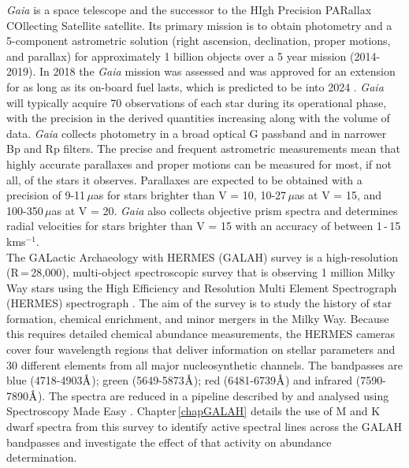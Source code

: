 \textit{Gaia} \citep{2016Gaia} is a space telescope and the successor to the HIgh Precision PARallax COllecting Satellite \citep[HIPPARCOS;][]{1981Kovalevsky} satellite. Its primary mission is to obtain photometry and a 5-component astrometric solution (right ascension, declination, proper motions, and parallax) for approximately 1 billion objects over a 5 year mission (2014-2019). In 2018 the \textit{Gaia} mission was assessed and was approved for an extension for as long as its on-board fuel lasts, which is predicted to be into 2024 \citep{2019Brown}. \textit{Gaia} will typically acquire 70 observations of each star during its operational phase, with the precision in the derived quantities increasing along with the volume of data. \textit{Gaia} collects photometry in a broad optical G passband and in narrower Bp and Rp filters. The precise and frequent astrometric measurements mean that highly accurate parallaxes and proper motions can be measured for most, if not all, of the stars it observes. Parallaxes are expected to be obtained with a precision of 9-11\,$\mu$as for stars brighter than V = 10, 10-27\,$\mu$as at V = 15, and 100-350\,$\mu$as at V = 20. \textit{Gaia} also collects objective prism spectra and determines radial velocities for stars brighter than V = 15 with an accuracy of between 1\,-\,15\,kms$^{-1}$.\\

The GALactic Archaeology with HERMES (GALAH) survey \citep{2021Buder} is a high-resolution (R\,=\,28,000), multi-object spectroscopic survey that is observing 1 million Milky Way stars using the High Efficiency and Resolution Multi Element Spectrograph (HERMES) spectrograph \citep{2015Sheinis}. The aim of the survey is to study the history of star formation, chemical enrichment, and minor mergers in the Milky Way. Because this requires detailed chemical abundance measurements, the HERMES cameras cover four wavelength regions that deliver information on stellar parameters and 30 different elements from all major nucleosynthetic channels. The bandpasses are blue (4718-4903$\hbox{\AA}$); green (5649-5873$\hbox{\AA}$); red (6481-6739$\hbox{\AA}$) and infrared (7590-7890$\hbox{\AA}$). The spectra are reduced in a pipeline described by \citet{2017Kos} and analysed using Spectroscopy Made Easy \citep[SME;][]{1996Valenti}. Chapter\,\ref{chapGALAH} details the use of M and K dwarf spectra from this survey to identify active spectral lines across the GALAH bandpasses and investigate the effect of that activity on abundance determination.

